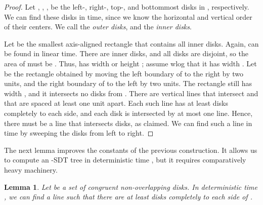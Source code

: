 \documentclass{paper}
\newtheorem{lemma}[theorem]{Lemma}
\begin{document}
\begin{proof}
Let , , ,  be the  left-, right-,
top-, and bottommost disks in , respectively.
We can find these disks in  time, since we know the horizontal
and vertical order of their centers. We call 
 the \emph{outer disks}, and
 the \emph{inner disks}.

Let  be the smallest axis-aligned rectangle that contains
all inner disks. Again,  can be found in linear time. 
There are  inner disks, and all
disks are disjoint, so the area of  must be .
Thus,  has width or height ; assume 
wlog that it has width . Let  be
the rectangle obtained by moving the left boundary of  to the right
by two units, and the right boundary of  to the left by two units.
The rectangle  still has width , and it intersects
no disks from .
There are  vertical lines that intersect
 and that are spaced at least one unit apart.
Each such line has at least  disks completely to each side, and
each disk is intersected by at most one line. 
Hence, there must be a line that intersects  disks, as claimed.
We can find such a line in  time by sweeping the disks from
left to right.
\end{proof}


The next lemma improves the constants of the previous construction. It
allows us to compute an -SDT
tree in deterministic time , but it requires comparatively heavy machinery.
\begin{lemma}\label{lem:sdt_matousek}
Let  be a set of  congruent non-overlapping disks.
In deterministic time , we can find a line  such
that there are at least  disks completely to each side
of .
\end{lemma}
\end{document}
